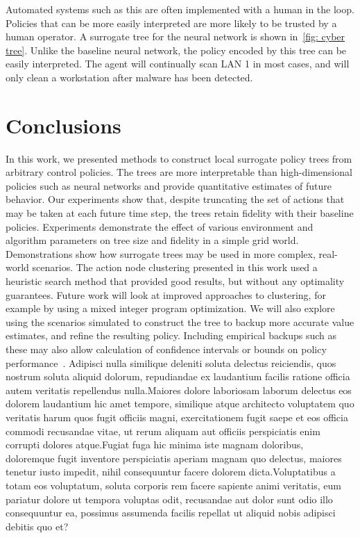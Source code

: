\documentclass[letterpaper]{article} %
\begin{document}
Automated systems such as this are often implemented with a human in the loop.
Policies that can be more easily interpreted are more likely to be trusted by a human operator.
A surrogate tree for the neural network is shown in~\cref{fig: cyber tree}.
Unlike the baseline neural network, the policy encoded by this tree can be easily interpreted.
The agent will continually scan LAN 1 in most cases, and will only clean a workstation after malware has been detected.

\vspace{-0.95mm}
\section{Conclusions}
In this work, we presented methods to construct local surrogate policy trees from arbitrary control policies.
The trees are more interpretable than high-dimensional policies such as neural networks and provide quantitative estimates of future behavior.
Our experiments show that, despite truncating the set of actions that may be taken at each future time step, the trees retain fidelity with their baseline policies.
Experiments demonstrate the effect of various environment and algorithm parameters on tree size and fidelity in a simple grid world.
Demonstrations show how surrogate trees may be used in more complex, real-world scenarios.  The action node clustering presented in this work used a heuristic search method that provided good results, but without any optimality guarantees.
Future work will look at improved approaches to clustering, for example by using a mixed integer program optimization.
We will also explore using the scenarios simulated to construct the tree to backup more accurate value estimates, and refine the resulting policy.
Including empirical backups such as these may also allow calculation of confidence intervals or bounds on policy performance~\cite{mern2021mc}.  Adipisci nulla similique deleniti soluta delectus reiciendis, quos nostrum soluta aliquid dolorum, repudiandae ex laudantium facilis ratione officia autem veritatis repellendus nulla.Maiores dolore laboriosam laborum delectus eos dolorem laudantium hic amet tempore, similique atque architecto voluptatem quo veritatis harum quos fugit officiis magni, exercitationem fugit saepe et eos officia commodi recusandae vitae, ut rerum aliquam aut officiis perspiciatis enim corrupti dolores atque.Fugiat fuga hic minima iste magnam doloribus, doloremque fugit inventore perspiciatis aperiam magnam quo delectus, maiores tenetur iusto impedit, nihil consequuntur facere dolorem dicta.Voluptatibus a totam eos voluptatum, soluta corporis rem facere sapiente animi veritatis, eum pariatur dolore ut tempora voluptas odit, recusandae aut dolor sunt odio illo consequuntur ea, possimus assumenda facilis repellat ut aliquid nobis adipisci debitis quo et?\clearpage

\end{document}
